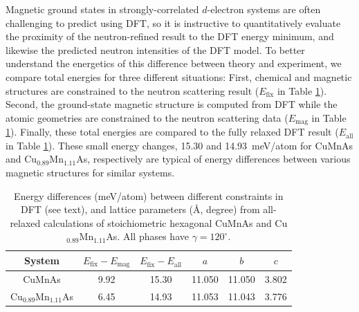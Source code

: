 \documentclass[10pt,doublespacing,edeposit]{uiucthesis2020}
\begin{document}
\begin{mainmatter}
Magnetic ground states in strongly-correlated $d$-electron systems are often challenging to predict using DFT,
so it is instructive to quantitatively evaluate the proximity of the neutron-refined result to the DFT energy minimum, and likewise the predicted neutron intensities of the DFT model.
To better understand the energetics of this difference between theory and experiment, we compare total energies for three different situations:
First, chemical and magnetic structures are constrained to the neutron scattering result ($E_\mathrm{fix}$ in Table \ref{tab:DFT-energy-latparam}).
Second, the ground-state magnetic structure is computed from DFT while the atomic geometries are constrained to the neutron scattering data ($E_\mathrm{mag}$ in Table \ref{tab:DFT-energy-latparam}).
Finally, these total energies are compared to the fully relaxed DFT result ($E_\mathrm{all}$ in Table \ref{tab:DFT-energy-latparam}).
These small energy changes, 15.30 and 14.93~meV/atom for CuMnAs and Cu$_{0.89}$Mn$_{1.11}$As, respectively are typical of energy differences between various magnetic structures for similar systems.\cite{Alsolami2012Auth}

\begin{table}
\caption{\label{tab:DFT-energy-latparam} 
Energy differences (meV/atom) between different constraints in DFT (see text), and lattice parameters (\AA, degree) from all-relaxed calculations of stoichiometric hexagonal CuMnAs and Cu$_{0.89}$Mn$_{1.11}$As. All phases have $\gamma = 120^\circ$.
}
\centering
\begin{tabular}{cccccc}
\hline\hline
System	 & $E_\mathrm{fix}-E_\mathrm{mag}$	 & $E_\mathrm{fix}-E_\mathrm{all}$	 & $a$	 & $b$	 & $c$ \\
\hline
CuMnAs	 & 9.92	 & 15.30	 & 11.050	 & 11.050	 & 3.802\\
Cu$_{0.89}$Mn$_{1.11}$As	 & 6.45	 & 14.93	 & 11.053	 & 11.043	 & 3.776\\
\hline \hline
\end{tabular}
~\\
\end{table}


\end{mainmatter}
\end{document}
